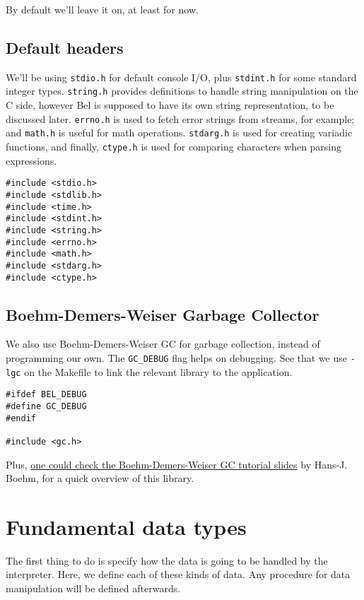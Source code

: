 \documentclass[openright,a4paper,twoside,12pt]{memoir}
\begin{document}
By default we'll leave it on, at least for now.

\section{Default headers}
\label{sec:org6b35838}

We'll be using \texttt{stdio.h} for default console I/O, plus \texttt{stdint.h} for some
standard integer types. \texttt{string.h} provides definitions to handle string
manipulation on the C side, however Bel is supposed to have its own
string representation, to be discussed later. \texttt{errno.h} is used to fetch
error strings from streams, for example; and \texttt{math.h} is useful for math
operations.  \texttt{stdarg.h} is  used  for creating  variadic functions,  and
finally,  \texttt{ctype.h}  is  used  for  comparing  characters  when  parsing
expressions.

\begin{verbatim}
#include <stdio.h>
#include <stdlib.h>
#include <time.h>
#include <stdint.h>
#include <string.h>
#include <errno.h>
#include <math.h>
#include <stdarg.h>
#include <ctype.h>
\end{verbatim}

\section{Boehm-Demers-Weiser Garbage Collector}
\label{sec:orgdf50217}

We also use Boehm-Demers-Weiser GC for garbage collection, instead of
programming our own. The \texttt{GC\_DEBUG} flag helps on debugging. See that we
use \texttt{-lgc} on the Makefile to link the relevant library to the
application.

\begin{verbatim}
#ifdef BEL_DEBUG
#define GC_DEBUG
#endif

#include <gc.h>
\end{verbatim}

Plus, \href{https://www.hboehm.info/gc/04tutorial.pdf}{one could check the Boehm-Demers-Weiser GC tutorial slides} by
Hans-J. Boehm, for a quick overview of this library.

\chapter{Fundamental data types}
\label{sec:org794e31d}

The first thing to do is specify how the data is going to be handled
by the interpreter. Here, we define each of these kinds of data. Any
procedure for data manipulation will be defined afterwards.
\end{document}
